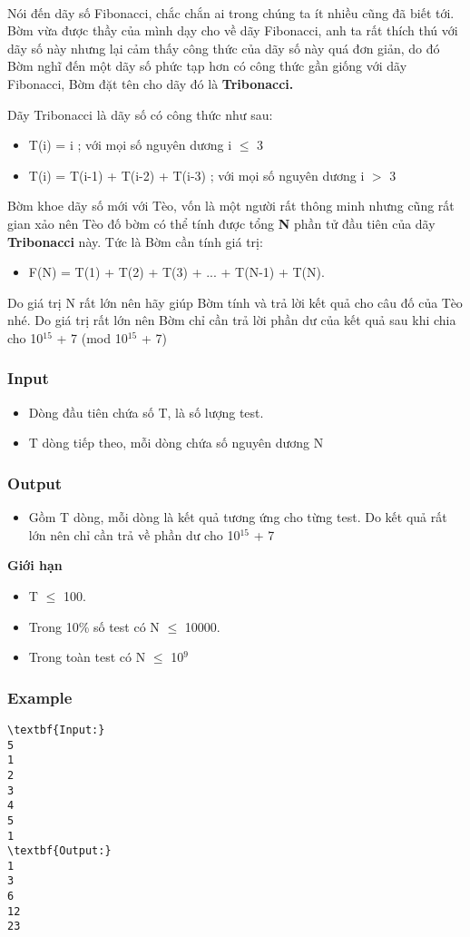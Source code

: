 

 

Nói đến dãy số Fibonacci, chắc chắn ai trong chúng ta ít nhiều cũng đã biết tới. Bờm vừa được thầy của mình dạy cho về dãy Fibonacci, anh ta rất thích thú với dãy số này nhưng lại cảm thấy công thức của dãy số này quá đơn giản, do đó Bờm nghĩ đến một dãy số phức tạp hơn có công thức gần giống với dãy Fibonacci, Bờm đặt tên cho dãy đó là \textbf{ Tribonacci. }

Dãy Tribonacci là dãy số có công thức như sau:
\begin{itemize}
	\item T(i) = i ; với mọi số nguyên dương i  $\le$  3
	\item T(i) = T(i-1) + T(i-2) + T(i-3) ; với mọi số nguyên dương i $>$ 3
\end{itemize}

Bờm khoe dãy số mới với Tèo, vốn là một người rất thông minh nhưng cũng rất gian xảo nên Tèo đố bờm có thể tính được tổng \textbf{ N } phần tử đầu tiên của dãy \textbf{ Tribonacci } này. Tức là Bờm cần tính giá trị:
\begin{itemize}
	\item F(N) = T(1) + T(2) + T(3) + ... + T(N-1) + T(N).
\end{itemize}

Do giá trị N rất lớn nên hãy giúp Bờm tính và trả lời kết quả cho câu đố của Tèo nhé. Do giá trị rất lớn nên Bờm chỉ cần trả lời phần dư của kết quả sau khi chia cho 10$^15 $ + 7 (mod 10$^15 $ + 7)

\subsubsection{Input}
\begin{itemize}
	\item Dòng đầu tiên chứa số T, là số lượng test.
	\item T dòng tiếp theo, mỗi dòng chứa số nguyên dương N
\end{itemize}

\subsubsection{Output}
\begin{itemize}
	\item Gồm T dòng, mỗi dòng là kết quả tương ứng cho từng test. Do kết quả rất lớn nên chỉ cần trả về phần dư cho 10$^15 $ + 7
\end{itemize}

\textbf{Giới hạn }
\begin{itemize}
	\item T  $\le$  100.
	\item Trong 10\% số test có N  $\le$  10000.
	\item Trong toàn test có N  $\le$  10$^9 $
\end{itemize}

\subsubsection{Example}
\begin{verbatim}
\textbf{Input:}
5
1
2
3
4
5
1
\textbf{Output:}
1
3
6
12
23
\end{verbatim}

